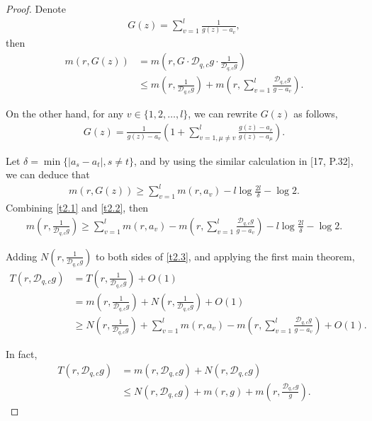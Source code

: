 \documentclass[sn-mathphys-num]{sn-jnl}%
\theoremstyle{thmstyleone}%
\theoremstyle{thmstyletwo}%
\theoremstyle{thmstylethree}%
\begin{document}
\begin{proof}
	Denote
	\begin{align*}
		G(z)=\sum_{v=1}^{l}\frac{1}{g(z)-a_{v}},
	\end{align*}	
	then
	\begin{align}\label{t2.1}
		m(r,G(z))&=m\left(r,G\cdot\mathcal{D}_{q,c}g\cdot\frac{1}{\mathcal{D}_{q,c}g}\right)\nonumber\\
		&\leq m\left(r,\frac{1}{\mathcal{D}_{q,c}g}\right)+m\left(r,\sum_{v=1}^{l}\frac{\mathcal{D}_{q,c}g}{g-a_{v}}\right).
	\end{align}	
	
	On the other hand, for any $v\in\{1,2,\ldots,l\}$, we can rewrite $G(z)$ as follows,
	\begin{align*}
		G(z)=\frac{1}{g(z)-a_{v}}\left(1+\sum_{v=1,\mu\neq v}^{l}\frac{g(z)-a_{v}}{g(z)-a_{\mu}}\right).
	\end{align*}
	
	Let $\delta=\min\{|a_{s}-a_{t}|,s\neq t\}$, and by using the similar calculation in [17, P.32], we can deduce that
	\begin{align}\label{t2.2}
		m(r,G(z))\geq\sum_{v=1}^{l}m(r,a_{v})-l\log\frac{2l}{\delta}-\log2.
	\end{align}
	Combining \eqref{t2.1} and \eqref{t2.2}, then
	\begin{align}\label{t2.3}
		 m\left(r,\frac{1}{\mathcal{D}_{q,c}g}\right)\geq\sum_{v=1}^{l}m(r,a_{v})-m\left(r,\sum_{v=1}^{l}\frac{\mathcal{D}_{q,c}g}{g-a_{v}}\right)-l\log\frac{2l}{\delta}-\log2.
	\end{align}
	
	Adding $N\left(r,\frac{1}{\mathcal{D}_{q,c}g}\right)$ to both sides of \eqref{t2.3}, and applying the first main theorem,
	\begin{align}\label{t2.4}
		T(r,\mathcal{D}_{q,c}g)&=T\left(r,\frac{1}{\mathcal{D}_{q,c}g}\right)+O(1)\nonumber\\
		&=m\left(r,\frac{1}{\mathcal{D}_{q,c}g}\right)+N\left(r,\frac{1}{\mathcal{D}_{q,c}g}\right)+O(1)\\
		&\geq N\left(r,\frac{1}{\mathcal{D}_{q,c}g}\right)+\sum_{v=1}^{l}m(r,a_{v})-m\left(r,\sum_{v=1}^{l}\frac{\mathcal{D}_{q,c}g}{g-a_{v}}\right)+O(1).\nonumber
	\end{align}
	
	In fact,
	\begin{align}\label{t2.5}
		T(r,\mathcal{D}_{q,c}g)&=m(r,\mathcal{D}_{q,c}g)+N(r,\mathcal{D}_{q,c}g)\nonumber\\
		&\leq N(r,\mathcal{D}_{q,c}g)+m(r,g)+m\left(r,\frac{\mathcal{D}_{q,c}g}{g}\right).
	\end{align}
	

\end{proof}
\end{document}

